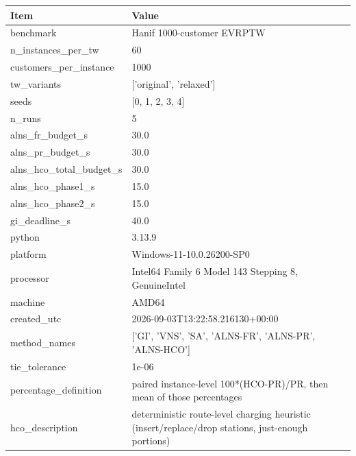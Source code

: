\begin{tabular}{ll}
\toprule
Item & Value \\
\midrule
benchmark & Hanif 1000-customer EVRPTW \\
n_instances_per_tw & 60 \\
customers_per_instance & 1000 \\
tw_variants & ['original', 'relaxed'] \\
seeds & [0, 1, 2, 3, 4] \\
n_runs & 5 \\
alns_fr_budget_s & 30.0 \\
alns_pr_budget_s & 30.0 \\
alns_hco_total_budget_s & 30.0 \\
alns_hco_phase1_s & 15.0 \\
alns_hco_phase2_s & 15.0 \\
gi_deadline_s & 40.0 \\
python & 3.13.9 \\
platform & Windows-11-10.0.26200-SP0 \\
processor & Intel64 Family 6 Model 143 Stepping 8, GenuineIntel \\
machine & AMD64 \\
created_utc & 2026-09-03T13:22:58.216130+00:00 \\
method_names & ['GI', 'VNS', 'SA', 'ALNS-FR', 'ALNS-PR', 'ALNS-HCO'] \\
tie_tolerance & 1e-06 \\
percentage_definition & paired instance-level 100*(HCO-PR)/PR, then mean of those percentages \\
hco_description & deterministic route-level charging heuristic (insert/replace/drop stations, just-enough portions) \\
\bottomrule
\end{tabular}
